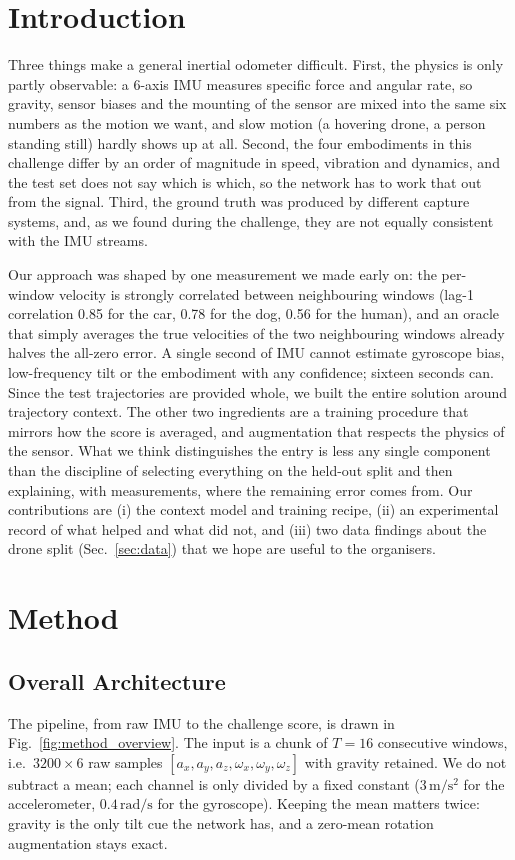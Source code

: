 \documentclass[letterpaper,10pt,conference]{ieeeconf}
\begin{document}
\section{Introduction}
Three things make a general inertial odometer difficult. First, the physics is only partly observable: a 6-axis
IMU measures specific force and angular rate, so gravity, sensor biases and the mounting of the sensor are mixed into
the same six numbers as the motion we want, and slow motion (a hovering drone, a person standing still) hardly shows
up at all. Second, the four embodiments in this challenge differ by an order of magnitude in speed, vibration and
dynamics, and the test set does not say which is which, so the network has to work that out from the signal. Third,
the ground truth was produced by different capture systems, and, as we found during the challenge, they are not
equally consistent with the IMU streams.

Our approach was shaped by one measurement we made early on: the per-window velocity is strongly correlated between
neighbouring windows (lag-1 correlation 0.85 for the car, 0.78 for the dog, 0.56 for the human), and an oracle that
simply averages the true velocities of the two neighbouring windows already halves the all-zero error. A single
second of IMU cannot estimate gyroscope bias, low-frequency tilt or the embodiment with any confidence; sixteen
seconds can. Since the test trajectories are provided whole, we built the entire solution around trajectory context.
The other two ingredients are a training procedure that mirrors how the score is averaged, and augmentation that
respects the physics of the sensor. What we think distinguishes the entry is less any single component than the
discipline of selecting everything on the held-out split and then explaining, with measurements, where the remaining
error comes from. Our contributions are (i) the context model and training recipe, (ii) an experimental record of
what helped and what did not, and (iii) two data findings about the drone split (Sec.~\ref{sec:data}) that we hope
are useful to the organisers.

\section{Method}
\subsection{Overall Architecture}
The pipeline, from raw IMU to the challenge score, is drawn in Fig.~\ref{fig:method_overview}. The input is a chunk of $T{=}16$ consecutive windows, i.e.\
$3200\times 6$ raw samples $[a_x,a_y,a_z,\omega_x,\omega_y,\omega_z]$ with gravity retained. We do not subtract a
mean; each channel is only divided by a fixed constant ($3\,\mathrm{m/s^2}$ for the accelerometer,
$0.4\,\mathrm{rad/s}$ for the gyroscope). Keeping the mean matters twice: gravity is the only tilt cue the network
has, and a zero-mean rotation augmentation stays exact.
\end{document}

